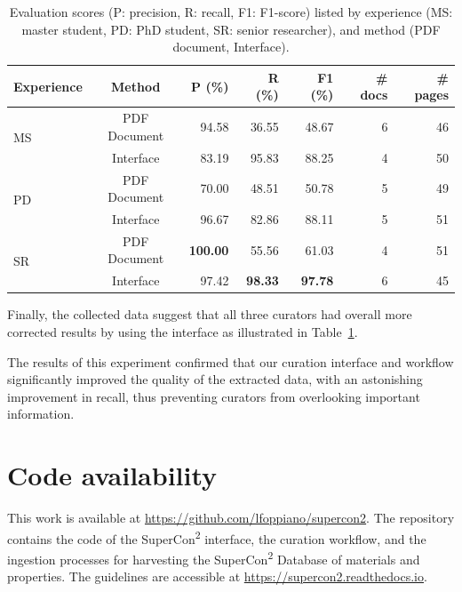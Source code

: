 \begin{table}[h]
\centering\small
\caption{Evaluation scores (P: precision, R: recall, F1: F1-score) listed by experience (MS: master student, PD: PhD student, SR: senior researcher), and method (PDF document, Interface). }
\begin{tabular}{lcrrrrr}
\toprule
\textbf{Experience} & \textbf{Method} & \textbf{P (\%)} & \textbf{R (\%)} & 
\textbf{F1 (\%)}  & \textbf{\# docs} & \textbf{\# pages}\\
\midrule
\multirow{2}{*}{MS} & PDF Document & 94.58 & 36.55 & 48.67 & 6 & 46 \\
 & Interface & 83.19 & 95.83 & 88.25 & 4 & 50 \\
\midrule
\multirow{2}{*}{PD} & PDF Document & 70.00 & 48.51 & 50.78 & 5 & 49 \\
 & Interface & 96.67 & 82.86 & 88.11 & 5 & 51\\
\midrule
\multirow{2}{*}{SR} & PDF Document & \textbf{100.00} & 55.56 & 61.03 & 4 & 51\\
 & Interface & 97.42 & \textbf{98.33} & \textbf{97.78} & 6 & 45\\
\bottomrule
\end{tabular}
\label{tab:accuracy-by-experience-method}
\end{table}

Finally, the collected data suggest that all three curators had overall more corrected results by using the interface as illustrated in Table~\ref{tab:accuracy-by-experience-method}. 

The results of this experiment confirmed that our curation interface and workflow significantly improved the quality of the extracted data, with an astonishing improvement in recall, thus preventing curators from overlooking important information.

\section{Code availability}
This work is available at \url{https://github.com/lfoppiano/supercon2}. The repository contains the code of the SuperCon\textsuperscript{2} interface, the curation workflow, and the ingestion processes for harvesting the SuperCon\textsuperscript{2} Database of materials and properties. The guidelines are accessible at \url{https://supercon2.readthedocs.io}.


